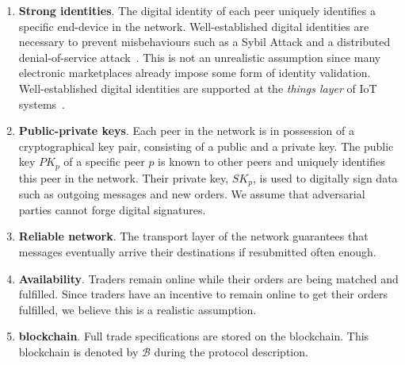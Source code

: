 \begin{enumerate}
	\item \textbf{Strong identities}. The digital identity of each peer uniquely identifies a specific end-device in the network. 
	Well-established digital identities are necessary to prevent misbehaviours such as a Sybil Attack and a distributed denial-of-service attack~\cite{douceur2002sybil}\cite{Specht2004DistributedDO}.
	This is not an unrealistic assumption since many electronic marketplaces already impose some form of identity validation.
	Well-established digital identities are supported at the \textit{things layer} of IoT systems~\cite{wang2018privacy}.
	\item \textbf{Public-private keys}. Each peer in the network is in possession of a cryptographical key pair, consisting of a public and a private key. 
	The public key $ PK_p $ of a specific peer $ p $ is known to other peers and uniquely identifies this peer in the network. 
	Their private key, $ SK_p $, is used to digitally sign data such as outgoing messages and new orders. 
	We assume that adversarial parties cannot forge digital signatures.
	\item \textbf{Reliable network}. The transport layer of the network guarantees that messages eventually arrive their destinations if resubmitted often enough.
	\item \textbf{Availability}. Traders remain online while their orders are being matched and fulfilled.
	Since traders have an incentive to remain online to get their orders fulfilled, we believe this is a realistic assumption.
	\item \textbf{\ModelName{} blockchain}. Full trade specifications are stored on the \ModelName{} blockchain. This blockchain is denoted by $ \mathcal{B} $ during the protocol description.
\end{enumerate}

